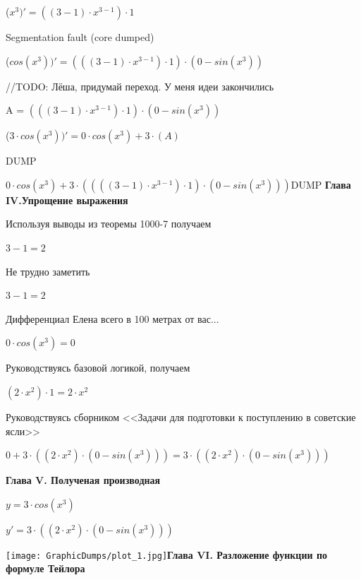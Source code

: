\documentclass[12pt,a4paper,fleqn]{article}
\begin{document}
\begin{center}
 ($x^{3})'
  = ((3-1) \cdot x^{3-1}) \cdot 1$\end{center}
Segmentation fault (core dumped)

\begin{center}
 ($cos(x^{3}))'
  = (((3-1) \cdot x^{3-1}) \cdot 1) \cdot (0-sin(x^{3}))$\end{center}
//TODO: Лёша, придумай переход. У меня идеи закончились

\begin{center}
A = $(((3-1) \cdot x^{3-1}) \cdot 1) \cdot (0-sin(x^{3}))$\end{center}
\begin{center}
 ($3 \cdot cos(x^{3}))'
  = 0 \cdot cos(x^{3})+3 \cdot (A)$\end{center}
DUMP

$0 \cdot cos(x^{3})+3 \cdot ((((3-1) \cdot x^{3-1}) \cdot 1) \cdot (0-sin(x^{3})))$DUMP
\newpage \textbf{\LARGE{Глава IV.Упрощение выражения}}

Используя выводы из теоремы 1000-7 получаем

\begin{center}$3-1 = 2$\end{center}
Не трудно заметить

\begin{center}$3-1 = 2$\end{center}
Дифференциал Елена всего в 100 метрах от вас...

\begin{center}
$0 \cdot cos(x^{3}) = 0$\end{center}
Руководствуясь базовой логикой, получаем

\begin{center}
$(2 \cdot x^{2}) \cdot 1 = 2 \cdot x^{2}$\end{center}
Руководствуясь сборником <<Задачи для подготовки к поступлению в советские ясли>>\cite{link1}

\begin{center}
$0+3 \cdot ((2 \cdot x^{2}) \cdot (0-sin(x^{3}))) = 3 \cdot ((2 \cdot x^{2}) \cdot (0-sin(x^{3})))$\end{center}
\newpage \textbf{\LARGE{Глава V. Полученая производная}}

$y = $$3 \cdot cos(x^{3})$

$y' = $$3 \cdot ((2 \cdot x^{2}) \cdot (0-sin(x^{3})))$

\texttt{[image: GraphicDumps/plot\_1.jpg]}\newpage \textbf{\LARGE{Глава VI. Разложение функции по формуле Тейлора}}
\end{document}
